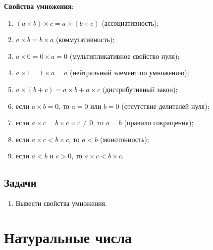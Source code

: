\textbf{Свойства умножения}:
\begin{enumerate}[label=P\arabic*]
\item $(a\times b)\times c = a\times (b\times c)$ (ассоциативность);
\item $a\times b=b\times a$ (коммутативность);
\item $a\times 0=0\times a=0$ (мультипликативное свойство нуля);
\item $a\times 1=1\times a=a$ (нейтральный элемент по умножению);
\item $a\times(b+c)=a\times b+a\times c$ (дистрибутивный закон);
\item если $a\times b=0$, то $a=0$ или $b=0$ (отсутствие делителей нуля);
\item если $a\times c=b\times c$ и $c\ne 0$, то $a=b$ (правило сокращения);
\item если $a\times c<b\times c$, то $a<b$ (монотонность);
\item если $a<b$ и $c>0$, то $a\times c<b\times c$.
\end{enumerate}


\subsection*{Задачи}
\begin{enumerate}
\item Вывести свойства умножения.
\end{enumerate}

\section{Натуральные числа}

